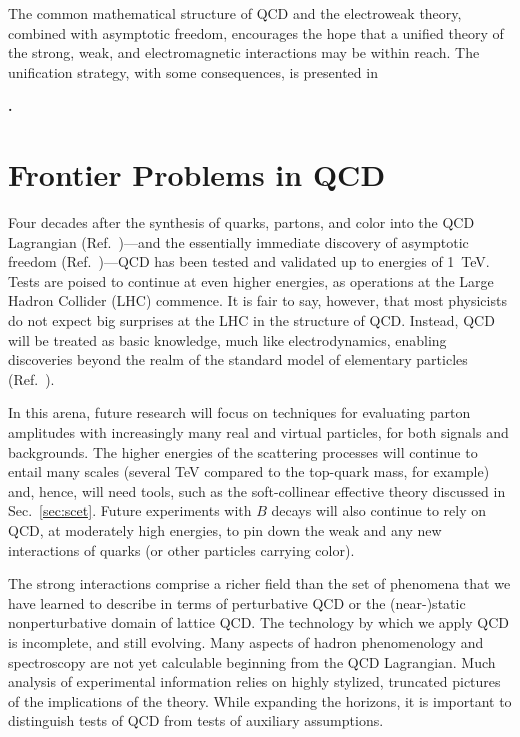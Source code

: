 \documentclass[prb,groupedaddress,nofootinbib,showpacs,twocolumn,floatfix]{revtex4}
\newcommand{\citentry}[1]{%
\par\addvspace{0.5em plus 0.05em minus 0.05em}%
\sloppy
\noindent\textbf{\onlinecite{#1}.}~\bibentry{#1}%
\par\addvspace{0.5em plus 0.05em minus 0.05em}
}
\begin{document}
The common mathematical structure of QCD and the electroweak theory,
combined with asymptotic freedom, encourages the hope that a unified
theory of the strong, weak, and electromagnetic interactions may be
within reach.
The unification strategy, with some consequences, is presented in
\citentry{Georgi:1981yp}

\section{Frontier Problems in QCD}
\label{sec:outlook}

Four decades after the synthesis of quarks, partons, and color into the 
QCD Lagrangian (Ref.~)---and the essentially 
immediate discovery of asymptotic 
freedom (Ref.~)---QCD 
has been tested and validated up to energies of 1~TeV.
Tests are poised to continue at even higher energies, as operations at 
the Large Hadron Collider (LHC) commence.
It is fair to say, however, that most physicists do not expect big 
surprises at the LHC in the structure of QCD.
Instead, QCD will be treated as basic knowledge, much like 
electrodynamics, enabling discoveries beyond the realm of the standard  
model of elementary particles (Ref.~).

In this arena, future research will focus on techniques for evaluating 
parton amplitudes with increasingly many real and virtual particles,
for both signals and backgrounds.
The higher energies of the scattering processes will continue to entail 
many scales (several TeV compared to the top-quark mass, for example) 
and, hence, will need tools, such as the soft-collinear effective theory
discussed in Sec.~\ref{sec:scet}.
Future experiments with $B$ decays will also continue to rely on QCD, 
at moderately high energies,  to pin down the weak and any new 
interactions of quarks (or other particles carrying color).

The strong interactions comprise a richer field than the set of 
phenomena that we have learned to describe in terms of perturbative QCD 
or the (near-)static nonperturbative domain of lattice QCD.
The technology by which we apply QCD is incomplete, and still evolving.
Many aspects of hadron phenomenology and spectroscopy are not yet 
calculable beginning from the QCD Lagrangian.
Much analysis of experimental information relies on highly stylized, 
truncated pictures of the implications of the theory.
While expanding the horizons, it is important to distinguish tests of 
QCD from tests of auxiliary assumptions.
\end{document}
